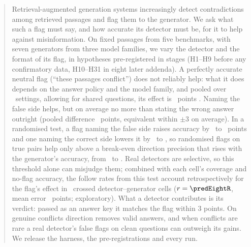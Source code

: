 \begin{abstract}
Retrieval-augmented generation systems increasingly detect contradictions among retrieved passages and flag them to
the generator. We ask what such a flag must say, and how accurate its detector must be, for it to help against
misinformation. On fixed passages from five benchmarks, with seven generators from three model families, we vary the
detector and the format of its flag, in hypotheses pre-registered in stages (H1--H9 before any confirmatory data,
H10--H31 in eight later addenda). A perfectly accurate neutral flag (``these passages conflict'') does not reliably
help: what it does depends on the answer policy and the model family, and pooled over \neuMlK\ settings, allowing
for shared questions, its effect is \neuMlMu\ points \neuMlCI. Naming the false side helps, but on average no more than
stating the wrong answer outright (pooled difference \PoolTwentyThree\ points, equivalent within $\pm$3 on average). In a
randomised test, a flag naming the false side
raises accuracy by \hThirtyOneAMin\ to \hThirtyOneAMax\ points and one naming the correct side lowers it by
\ahThirtyOneBMax\ to \ahThirtyOneBMin, so randomised flags on true pairs help only above a break-even direction
precision that rises with the generator's accuracy, from \beMin\ to \beMax. Real detectors are selective, so this
threshold alone can misjudge them; combined with each cell's coverage and no-flag accuracy, the follow rates from this
test account retrospectively for the flag's effect in \predEightN\ crossed detector--generator cells
($r=\predEightR$, mean error \predEightMae\ points; exploratory). What a
detector contributes is its verdict: passed as an answer key it matches the flag within 3 points. On genuine
conflicts direction removes valid answers, and when conflicts are rare a real detector's false flags on clean
questions can outweigh its gains. We release the harness, the pre-registrations and every run.
\end{abstract}
